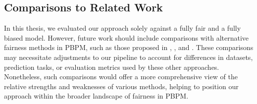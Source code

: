 \subsection*{Comparisons to Related Work}
In this thesis, we evaluated our approach solely against a fully fair and a fully biased model.
However, future work should include comparisons with alternative fairness methods in PBPM,
such as those proposed in \cite{fairness_foundation}, \cite{fairness_adversarial}, and \cite{fairness_independence}.
These comparisons may necessitate adjustments to our pipeline to account for differences in datasets,
prediction tasks, or evaluation metrics used by these other approaches.
Nonetheless, such comparisons would offer a more comprehensive view
of the relative strengths and weaknesses of various methods,
helping to position our approach within the broader landscape of fairness in PBPM.


